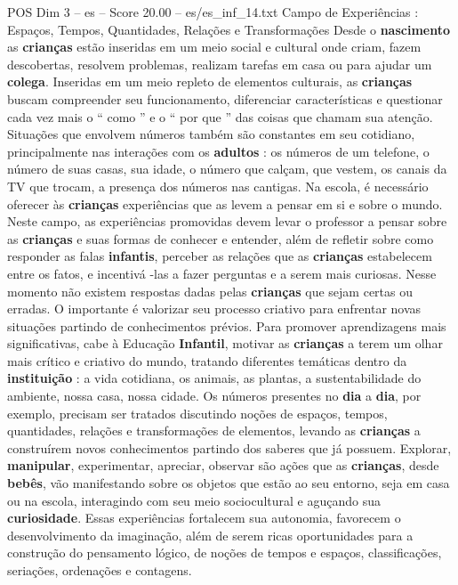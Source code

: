 \begin{textsample}{POS Dim 3 – es – Score 20.00 – es/es\_inf\_14.txt}  \label{ex:f3_pos_115}
Campo de Experiências : Espaços, Tempos, Quantidades, Relações e Transformações Desde o \textbf{nascimento} as \textbf{crianças} estão inseridas em um meio social e cultural onde criam, fazem descobertas, resolvem problemas, realizam tarefas em casa ou para ajudar um \textbf{colega}.
Inseridas em um meio repleto de elementos culturais, as \textbf{crianças} buscam compreender seu funcionamento, diferenciar características e questionar cada vez mais o “ como ” e o “ por que ” das coisas que chamam sua atenção.
Situações que envolvem números também são constantes em seu cotidiano, principalmente nas interações com os \textbf{adultos} : os números de um telefone, o número de suas casas, sua idade, o número que calçam, que vestem, os canais da TV que trocam, a presença dos números nas cantigas.
Na escola, é necessário oferecer às \textbf{crianças} experiências que as levem a pensar em si e sobre o mundo.
Neste campo, as experiências promovidas devem levar o professor a pensar sobre as \textbf{crianças} e suas formas de conhecer e entender, além de refletir sobre como responder as falas \textbf{infantis}, perceber as relações que as \textbf{crianças} estabelecem entre os fatos, e incentivá -las a fazer perguntas e a serem mais curiosas.
Nesse momento não existem respostas dadas pelas \textbf{crianças} que sejam certas ou erradas.
O importante é valorizar seu processo criativo para enfrentar novas situações partindo de conhecimentos prévios.
Para promover aprendizagens mais significativas, cabe à Educação \textbf{Infantil}, motivar as \textbf{crianças} a terem um olhar mais crítico e criativo do mundo, tratando diferentes temáticas dentro da \textbf{instituição} : a vida cotidiana, os animais, as plantas, a sustentabilidade do ambiente, nossa casa, nossa cidade.
Os números presentes no \textbf{dia} a \textbf{dia}, por exemplo, precisam ser tratados discutindo noções de espaços, tempos, quantidades, relações e transformações de elementos, levando as \textbf{crianças} a construírem novos conhecimentos partindo dos saberes que já possuem.
Explorar, \textbf{manipular}, experimentar, apreciar, observar são ações que as \textbf{crianças}, desde \textbf{bebês}, vão manifestando sobre os objetos que estão ao seu entorno, seja em casa ou na escola, interagindo com seu meio sociocultural e aguçando sua \textbf{curiosidade}.
Essas experiências fortalecem sua autonomia, favorecem o desenvolvimento da imaginação, além de serem ricas oportunidades para a construção do pensamento lógico, de noções de tempos e espaços, classificações, seriações, ordenações e contagens.

\end{textsample}
